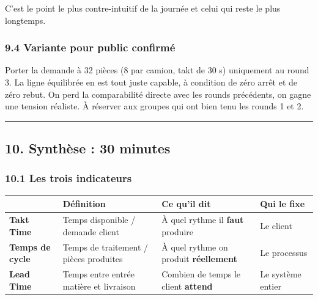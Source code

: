 \documentclass[
]{article}
\newcounter{none} %
\begin{document}
C'est le point le plus contre-intuitif de la journée et celui qui reste
le plus longtemps.

\subsubsection{9.4 Variante pour public
confirmé}\label{variante-pour-public-confirmuxe9}

Porter la demande à 32 pièces (8 par camion, takt de 30 s) uniquement au
round 3. La ligne équilibrée en est tout juste capable, à condition de
zéro arrêt et de zéro rebut. On perd la comparabilité directe avec les
rounds précédents, on gagne une tension réaliste. À réserver aux groupes
qui ont bien tenu les rounds 1 et 2.

\begin{center}\rule{0.5\linewidth}{0.5pt}\end{center}

\subsection{10. Synthèse : 30 minutes}\label{synthuxe8se-30-minutes}

\subsubsection{10.1 Les trois indicateurs}\label{les-trois-indicateurs}

{\def\LTcaptype{none} %
\begin{longtable}[]{@{}
  >{\raggedright\arraybackslash}p{}
  >{\raggedright\arraybackslash}p{}
  >{\raggedright\arraybackslash}p{}
  >{\raggedright\arraybackslash}p{}@{}}
\toprule\noalign{}
\begin{minipage}[b]{\linewidth}\raggedright
\end{minipage} & \begin{minipage}[b]{\linewidth}\raggedright
Définition
\end{minipage} & \begin{minipage}[b]{\linewidth}\raggedright
Ce qu'il dit
\end{minipage} & \begin{minipage}[b]{\linewidth}\raggedright
Qui le fixe
\end{minipage} \\
\midrule\noalign{}
\endhead
\bottomrule\noalign{}
\endlastfoot
\textbf{Takt Time} & Temps disponible / demande client & À quel rythme
il \textbf{faut} produire & Le client \\
\textbf{Temps de cycle} & Temps de traitement / pièces produites & À
quel rythme on produit \textbf{réellement} & Le processus \\
\textbf{Lead Time} & Temps entre entrée matière et livraison & Combien
de temps le client \textbf{attend} & Le système entier \\
\end{longtable}
}
\end{document}
